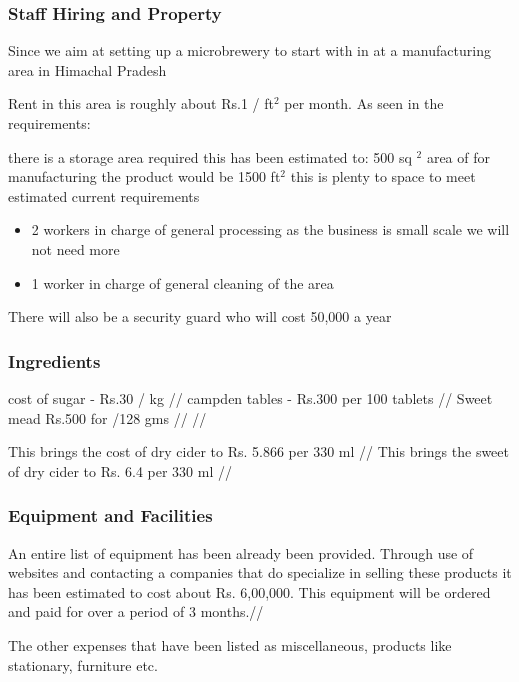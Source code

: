 \documentclass[11pt]{article}
\begin{document}
    \subsubsection{Staff Hiring and Property}
Since we aim at setting up a microbrewery to start with in at a manufacturing area in Himachal Pradesh

Rent in this area is roughly about Rs.1 / ft$^2$ per month.
As seen in the requirements:

there is a storage area required this has been estimated to: 500 sq $^2$ area of for manufacturing the product would be 1500 ft$^2$ this is plenty to space to meet estimated current requirements

    \begin{itemize}
\item 2 workers in charge of general processing as the business is small scale we will not need more
\item 1 worker in charge of general cleaning of the area
\end{itemize}

There will also be a security guard who will cost 50,000 a year
   \subsubsection{Ingredients}
cost of sugar -  Rs.30 / kg //
campden tables  - Rs.300 per 100 tablets //
Sweet mead Rs.500 for /128 gms //
//

This brings the cost of dry cider to Rs. 5.866 per 330 ml //
This brings the sweet of dry cider to Rs. 6.4 per 330 ml //

     \subsubsection{Equipment and Facilities}
     An entire list of equipment has been already been provided. Through use of websites and contacting a companies that do specialize in selling these products it has been estimated to cost about Rs. 6,00,000. This equipment will be ordered and paid for over a period of 3 months.//

The other expenses that have been listed as miscellaneous, products like stationary, furniture etc.


\newpage
\end{document}
